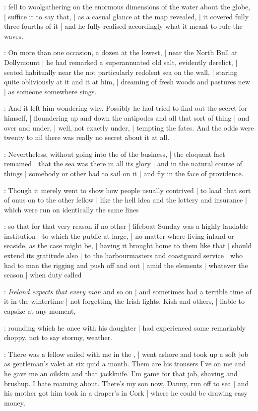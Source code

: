 :
fell to woolgathering on the enormous dimensions of the water about the globe, |
suffice it to say that, |
as a casual glance at the map revealed, |
it covered fully three-fourths of it |
and he fully realised accordingly what it meant to rule the waves.

:
On more than one occasion, a dozen at the lowest, |
near the North Bull at Dollymount |
he had remarked a superannuated old salt, evidently derelict, |
seated habitually near the not particularly redolent sea on the wall, |
staring quite obliviously at it and it at him, |
dreaming of fresh woods and pastures new |
as someone somewhere sings.

:
And it left him wondering why.
Possibly he had tried to find out the secret for himself, |
floundering up and down the antipodes and all that sort of thing |
and over and under, |
well, not exactly under, |
tempting the fates.
And the odds were twenty to nil there was really no secret about it at all.

:
Nevertheless, without going into the  of the business, |
the eloquent fact remained |
that the sea was there in all its glory |
and in the natural course of things |
somebody or other had to sail on it |
and fly in the face of providence.

:
Though it merely went to show how people usually contrived |
to load that sort of onus on to the other fellow |
like the hell idea and the lottery and insurance |
which were run on identically the same lines

:
so that for that very reason if no other |
lifeboat Sunday was a highly laudable institution |
to which the public at large, |
no matter where living inland or seaside, as the case might be, |
having it brought home to them like that |
should extend its gratitude also |
to the harbourmasters and coastguard service |
who had to man the rigging and push off and out |
amid the elements |
whatever the season |
when duty called

:
\emph{Ireland expects that every man} and so on |
and sometimes had a terrible time of it in the wintertime |
not forgetting the Irish lights, Kish and others, |
liable to capsize at any moment,

:
rounding which he once with his daughter |
had experienced some remarkably choppy, not to say stormy, weather.

\Murphy:
There was a fellow sailed with me in the , |
went ashore and took up a soft job as gentleman's valet at six quid a month.
Them are his trousers I've on me and he gave me an oilskin and that jackknife.
I'm game for that job, shaving and brushup.
I hate roaming about.
There's my son now, Danny, run off to sea |
and his mother got him took in a draper's in Cork |
where he could be drawing easy money.

